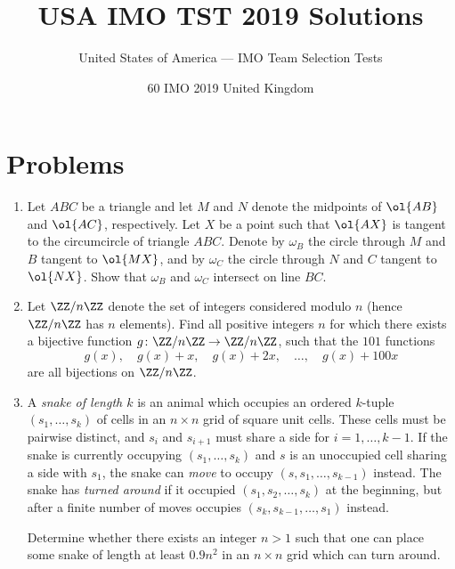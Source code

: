 \documentclass[11pt]{scrartcl}
\begin{document}
\title{USA IMO TST 2019 Solutions}
\subtitle{United States of America --- IMO Team Selection Tests}
\date{60 IMO 2019 United Kingdom}

\maketitle

\tableofcontents
\newpage

\addtocounter{section}{-1}
\section{Problems}
\begin{enumerate}[\bfseries 1.]
\item %
Let $ABC$ be a triangle and let $M$ and $N$
denote the midpoints of $\ol{AB}$ and $\ol{AC}$, respectively.
Let $X$ be a point such that $\ol{AX}$
is tangent to the circumcircle of triangle $ABC$.
Denote by $\omega_B$ the circle through $M$ and $B$ tangent to $\ol{MX}$,
and by $\omega_C$ the circle through $N$ and $C$ tangent to $\ol{NX}$.
Show that $\omega_B$ and $\omega_C$ intersect on line $BC$.

\item %
Let $\ZZ/n\ZZ$ denote the set of integers considered modulo $n$
(hence $\ZZ/n\ZZ$ has $n$ elements).
Find all positive integers $n$ for which there exists a bijective function
$g \colon \ZZ/n\ZZ \to \ZZ/n\ZZ$,
such that the $101$ functions
\[ g(x), \quad g(x)+x, \quad g(x)+2x, \quad \dots, \quad g(x)+100x \]
are all bijections on $\ZZ/n\ZZ$.

\item %
A \emph{snake of length $k$} is an animal
which occupies an ordered $k$-tuple
$(s_1, \dots, s_k)$ of cells in an $n \times n$ grid of square unit cells.
These cells must be pairwise distinct,
and $s_i$ and $s_{i+1}$ must share a side for $i=1,\dots,k-1$.
If the snake is currently occupying $(s_1, \dots, s_k)$
and $s$ is an unoccupied cell sharing a side with $s_1$,
the snake can \emph{move} to occupy $(s, s_1, \dots, s_{k-1})$ instead.
The snake has \emph{turned around} if it occupied $(s_1, s_2, \dots, s_k)$
at the beginning, but after a finite number of moves
occupies $(s_k, s_{k-1}, \dots, s_1)$ instead.

Determine whether there exists an integer $n > 1$
such that one can place some snake of length at least
$0.9n^2$ in an $n \times n$ grid which can turn around.


\end{enumerate}
\end{document}
